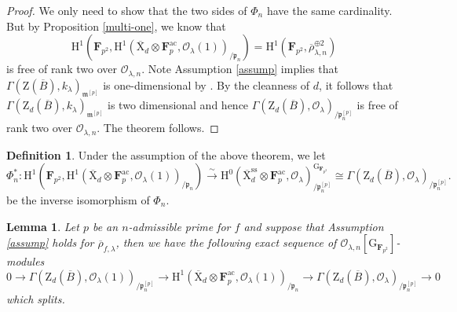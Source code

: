 \documentclass[10pt]{amsart}
\numberwithin{equation}{section}
\theoremstyle{plain}
\newtheorem{lemma}[theorem]{Lemma}
\numberwithin{equation}{section}
\theoremstyle{definition}
\newtheorem{definition}[theorem]{Definition}
\theoremstyle{remark}
\def\ac{\mathrm{ac}}
\def\frakm{\mathfrak{m}}
\def\ss{\mathrm{ss}}
\def\ac{\mathrm{ac}}
\def\calO{\mathcal{O}}
\def\frakm{\mathfrak{m}}
\def\frakp{\mathfrak{p}}
\def\FF{\mathbf{F}}
\def\rmG{\mathrm{G}}
\def\rmH{\mathrm{H}}
\def\rmX{\mathrm{X}}
\def\rmZ{\mathrm{Z}}
\begin{document}
\begin{proof}
We only need to show that the two sides of $\Phi_{n}$ have the same cardinality. But by Proposition \ref{multi-one}, we know that 
\begin{equation*}
\rmH^{1}(\FF_{p^{2}}, \rmH^{1}(\overline{\rmX}_{d}\otimes{\FF^{\ac}_{p}}, \calO_{\lambda}(1))_{/\frakp_{n}})=\rmH^{1}(\FF_{p^{2}}, \overline{\rho}^{\oplus2}_{\lambda, n})
\end{equation*}
is free of rank two over $\calO_{\lambda, n}$. Note Assumption \ref{assump} implies that $\Gamma(\rmZ(\overline{B}), k_{\lambda})_{\frakm^{[p]}}$ is one-dimensional by \cite[Proposition 6.8]{CH-1}. By the cleanness of $d$, it follows that $\Gamma(\rmZ_{d}(\overline{B}), k_{\lambda})_{\frakm^{[p]}}$ is two dimensional and hence $\Gamma(\rmZ_{d}(\overline{B}), \calO_{\lambda})_{/\frakp^{[p]}_{n}}$ is free of rank two over $\calO_{\lambda, n}$. The theorem follows.
\end{proof}
\begin{definition}\label{Phi-ast-n}
Under the assumption of the above theorem, we let 
\begin{equation*}
\Phi^{\ast}_{n}: \rmH^{1}(\FF_{p^{2}}, \rmH^{1}(\overline{\rmX}_{d} \otimes{\FF^{\ac}_{p}}, \calO_{\lambda}(1))_{/\frakp_{n}}) \xrightarrow{\sim}\rmH^{0}(\overline{\rmX}^{\ss}_{d}\otimes{\FF^{\ac}_{p}}, \calO_{\lambda})_{/\frakp^{[p]}_{n}}^{\rmG_{\FF_{p^{2}}}}\cong \Gamma(\rmZ_{d}(\overline{B}), \calO_{\lambda})_{/\frakp^{[p]}_{n}}.
\end{equation*}
be the inverse isomorphism of $\Phi_{n}$.
\end{definition}
\begin{lemma}\label{canonical-decomposition}
Let $p$ be an $n$-admissible prime for $f$ and suppose that Assumption \ref{assump} holds for $\overline{\rho}_{f,\lambda}$, then we have the following exact sequence of $\calO_{\lambda, n}[\rmG_{\FF_{p^{2}}}]$-modules
\begin{equation*}
0\rightarrow\Gamma(\rmZ_{d}(\overline{B}), \calO_{\lambda}(1))_{/\frakp^{[p]}_{n}}\rightarrow \rmH^{1}(\overline{\rmX}_{d}\otimes{\FF^{\ac}_{p}}, \calO_{\lambda}(1))_{/\frakp_{n}}\rightarrow \Gamma(\rmZ_{d}(\overline{B}), \calO_{\lambda})_{/\frakp^{[p]}_{n}}\rightarrow0
\end{equation*}
which splits.
\end{lemma}
\end{document}
